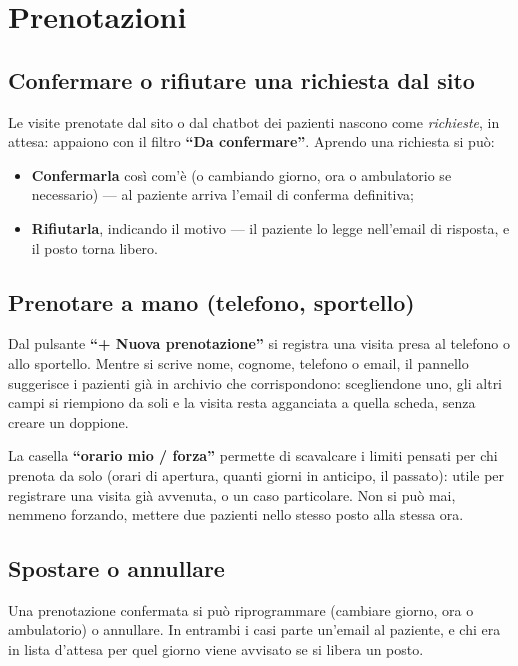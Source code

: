 \documentclass[11pt,a4paper]{article}
\newcommand{\bottone}[1]{\textbf{``#1''}}
\begin{document}
\section{Prenotazioni}

\subsection{Confermare o rifiutare una richiesta dal sito}

Le visite prenotate dal sito o dal chatbot dei pazienti nascono come \emph{richieste}, in attesa: appaiono con il filtro \bottone{Da confermare}. Aprendo una richiesta si può:

\begin{itemize}
  \item \textbf{Confermarla} così com'è (o cambiando giorno, ora o ambulatorio se necessario) --- al paziente arriva l'email di conferma definitiva;
  \item \textbf{Rifiutarla}, indicando il motivo --- il paziente lo legge nell'email di risposta, e il posto torna libero.
\end{itemize}

\subsection{Prenotare a mano (telefono, sportello)}

Dal pulsante \bottone{+ Nuova prenotazione} si registra una visita presa al telefono o allo sportello. Mentre si scrive nome, cognome, telefono o email, il pannello suggerisce i pazienti già in archivio che corrispondono: scegliendone uno, gli altri campi si riempiono da soli e la visita resta agganciata a quella scheda, senza creare un doppione.

La casella \bottone{orario mio / forza} permette di scavalcare i limiti pensati per chi prenota da solo (orari di apertura, quanti giorni in anticipo, il passato): utile per registrare una visita già avvenuta, o un caso particolare. Non si può mai, nemmeno forzando, mettere due pazienti nello stesso posto alla stessa ora.

\subsection{Spostare o annullare}

Una prenotazione confermata si può riprogrammare (cambiare giorno, ora o ambulatorio) o annullare. In entrambi i casi parte un'email al paziente, e chi era in lista d'attesa per quel giorno viene avvisato se si libera un posto.
\end{document}
